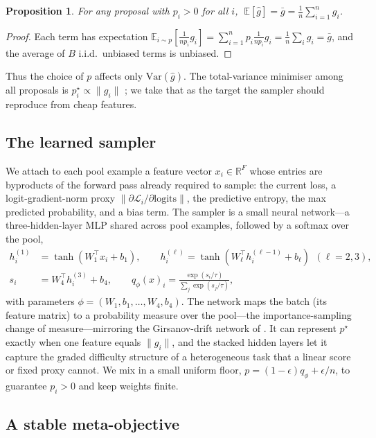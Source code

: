 \documentclass[11pt]{article}
\newtheorem{proposition}{Proposition}
\begin{document}
\begin{proposition}\label{prop:unbiased}
For any proposal with $p_i>0$ for all $i$, $\;\mathbb{E}[\hat g] = \bar g
= \tfrac1n\sum_{i=1}^n g_i$.
\end{proposition}
\begin{proof}
Each term has expectation
$\mathbb{E}_{i\sim p}\!\left[\frac{1}{n p_i} g_i\right]
= \sum_{i=1}^n p_i \frac{1}{n p_i} g_i = \frac1n \sum_i g_i = \bar g$, and the
average of $B$ i.i.d.\ unbiased terms is unbiased.
\end{proof}

Thus the choice of $p$ affects only $\mathrm{Var}(\hat g)$. The total-variance
minimiser among all proposals is $p^\star_i \propto \|g_i\|$
\citep{alain2015,katharopoulos2018}; we take that as the target the sampler
should reproduce from cheap features.

\subsection{The learned sampler}
We attach to each pool example a feature vector $x_i\in\mathbb{R}^F$ whose entries
are byproducts of the forward pass already required to sample: the current loss,
a logit-gradient-norm proxy $\|\partial \mathcal L_i/\partial \text{logits}\|$,
the predictive entropy, the max predicted probability, and a bias term. The
sampler is a small neural network---a three-hidden-layer MLP shared across
pool examples, followed by a softmax over the pool,
\begin{align}
h_i^{(1)} &= \tanh(W_1^\top x_i + b_1), \qquad
h_i^{(\ell)} = \tanh(W_\ell^\top h_i^{(\ell-1)} + b_\ell)\ \ (\ell=2,3), \nonumber\\
s_i &= W_4^\top h_i^{(3)} + b_4, \qquad
q_\phi(x)_i = \frac{\exp(s_i / \tau)}{\sum_{j}\exp(s_j/\tau)},
\end{align}
with parameters $\phi=(W_1,b_1,\dots,W_4,b_4)$. The network maps the batch (its
feature matrix) to a probability measure over the pool---the importance-sampling
change of measure---mirroring the Girsanov-drift network of \citet{virrion2020}.
It can represent $p^\star$ exactly when one feature equals $\|g_i\|$, and the
stacked hidden layers let it capture the graded difficulty structure of a
heterogeneous task that a linear score or fixed proxy cannot. We mix in a small
uniform floor, $p = (1-\epsilon)q_\phi + \epsilon/n$, to guarantee $p_i>0$ and
keep weights finite.

\subsection{A stable meta-objective}\label{ssec:meta}
\end{document}
